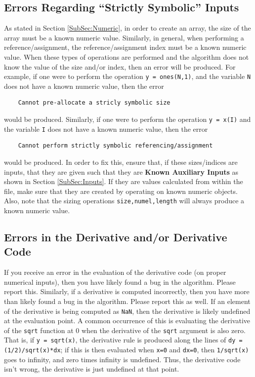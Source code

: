 \documentclass[10pt,pdftex]{article}
\begin{document}
\subsection{Errors Regarding ``Strictly Symbolic'' Inputs}
As stated in Section \ref{SubSec:Numeric}, in order to create an array, the size of the array must be a known numeric value. Similarly, in general, when performing a reference/assignment, the reference/assignment index must be a known numeric value. When these types of operations are performed and the algorithm does not know the value of the size and/or index, then an error will be produced. For example, if one were to perform the operation \texttt{y = ones(N,1)}, and the variable \texttt{N} does not have a known numeric value, then the error
\begin{verbatim}
    Cannot pre-allocate a stricly symbolic size
\end{verbatim}
would be produced. Similarly, if one were to perform the operation \texttt{y = x(I)} and the variable \texttt{I} does not have a known numeric value, then the error
\begin{verbatim}
    Cannot perform strictly symbolic referencing/assignment
\end{verbatim}
would be produced. In order to fix this, ensure that, if these sizes/indices are inputs, that they are given such that they are {\bf Known Auxiliary Inputs} as shown in Section \ref{SubSec:Inputs}. If they are values calculated from within the file, make sure that they are created by operating on known numeric objects. Also, note that the sizing operations \texttt{size,numel,length} will always produce a known numeric value.

\subsection{Errors in the Derivative and/or Derivative Code}
If you receive an error in the evaluation of the derivative code (on proper numerical inputs), then you have likely found a bug in the algorithm. Please report this. Similarly, if a derivative is computed incorrectly, then you have more than likely found a bug in the algorithm. Please report this as well.
If an element of the derivative is being computed as \texttt{NaN}, then the derivative is likely undefined at the evaluation point.
A common occurrence of this is evaluating the derivative of the \texttt{sqrt} function at 0 when the derivative of the \texttt{sqrt} argument is also zero.
That is, if \texttt{y = sqrt(x)}, the derivative rule is produced along the lines of \texttt{dy = (1/2)/sqrt(x)*dx}; if this is then evaluated when \texttt{x=0} and \texttt{dx=0}, then \texttt{1/sqrt(x)} goes to infinity, and zero times infinity is undefined.
Thus, the derivative code isn't wrong, the derivative is just undefined at that point. 
\end{document}
